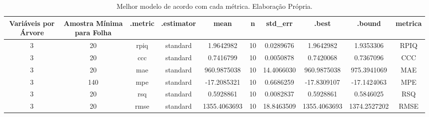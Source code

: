 \begin{table}

\caption{\label{tab:tabela_metricas}Melhor modelo de acordo com cada métrica. Elaboração Própria.}
\centering
\begin{tabular}[t]{c|c|c|c|c|c|c|c|c|c}
\hline
Variáveis por Árvore & Amostra Mínima para Folha & .metric & .estimator & mean & n & std\_err & .best & .bound & metrica\\
\hline
3 & 20 & rpiq & standard & 1.9642982 & 10 & 0.0289676 & 1.9642982 & 1.9353306 & RPIQ\\
\hline
3 & 20 & ccc & standard & 0.7416799 & 10 & 0.0050878 & 0.7420068 & 0.7367096 & CCC\\
\hline
3 & 20 & mae & standard & 960.9875038 & 10 & 14.4066030 & 960.9875038 & 975.3941069 & MAE\\
\hline
3 & 140 & mpe & standard & -17.2085321 & 10 & 0.6686259 & -17.8309107 & -17.1424063 & MPE\\
\hline
3 & 20 & rsq & standard & 0.5928861 & 10 & 0.0082837 & 0.5928861 & 0.5846025 & RSQ\\
\hline
3 & 20 & rmse & standard & 1355.4063693 & 10 & 18.8463509 & 1355.4063693 & 1374.2527202 & RMSE\\
\hline
\end{tabular}
\end{table}
